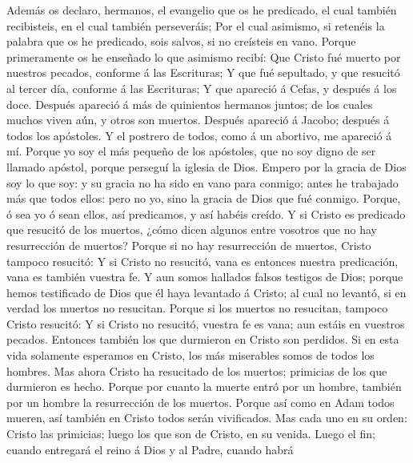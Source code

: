  Además os declaro, hermanos, el evangelio que os he
predicado, el cual también recibisteis, en el cual también perseveráis;
 Por el cual asimismo, si retenéis la palabra que os he
predicado, sois salvos, si no creísteis en vano.  Porque
primeramente os he enseñado lo que asimismo recibí: Que Cristo fué
muerto por nuestros pecados, conforme á las Escrituras;  Y
que fué sepultado, y que resucitó al tercer día, conforme á las
Escrituras;  Y que apareció á Cefas, y después á los doce.
 Después apareció á más de quinientos hermanos juntos; de
los cuales muchos viven aún, y otros son muertos.  Después
apareció á Jacobo; después á todos los apóstoles.  Y el
postrero de todos, como á un abortivo, me apareció á mí. 
Porque yo soy el más pequeño de los apóstoles, que no soy digno de ser
llamado apóstol, porque perseguí la iglesia de Dios. 
Empero por la gracia de Dios soy lo que soy: y su gracia no ha sido en
vano para conmigo; antes he trabajado más que todos ellos: pero no yo,
sino la gracia de Dios que fué conmigo.  Porque, ó sea yo
ó sean ellos, así predicamos, y así habéis creído.  Y si
Cristo es predicado que resucitó de los muertos, ¿cómo dicen algunos
entre vosotros que no hay resurrección de muertos? 
Porque si no hay resurrección de muertos, Cristo tampoco resucitó:
 Y si Cristo no resucitó, vana es entonces nuestra
predicación, vana es también vuestra fe.  Y aun somos
hallados falsos testigos de Dios; porque hemos testificado de Dios que
él haya levantado á Cristo; al cual no levantó, si en verdad los muertos
no resucitan.  Porque si los muertos no resucitan,
tampoco Cristo resucitó:  Y si Cristo no resucitó,
vuestra fe es vana; aun estáis en vuestros pecados. 
Entonces también los que durmieron en Cristo son perdidos.
 Si en esta vida solamente esperamos en Cristo, los más
miserables somos de todos los hombres.  Mas ahora Cristo
ha resucitado de los muertos; primicias de los que durmieron es hecho.
 Porque por cuanto la muerte entró por un hombre, también
por un hombre la resurrección de los muertos.  Porque así
como en Adam todos mueren, así también en Cristo todos serán
vivificados.  Mas cada uno en su orden: Cristo las
primicias; luego los que son de Cristo, en su venida. 
Luego el fin; cuando entregará el reino á Dios y al Padre, cuando habrá
